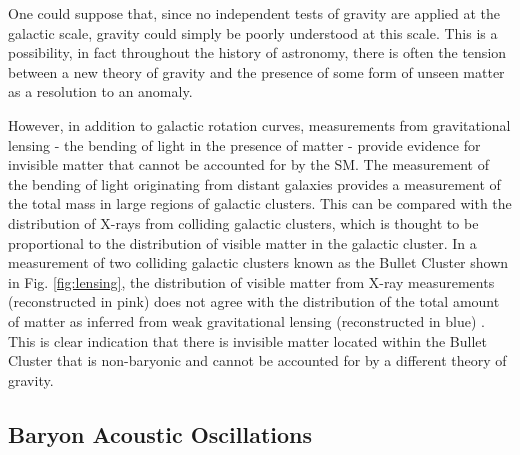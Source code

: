 One could suppose that, since no independent tests of gravity are applied at the galactic scale, gravity could simply be poorly understood at this scale. This is a possibility, in fact throughout the history of astronomy, there is often the tension between a new theory of gravity and the presence of some form of unseen matter as a resolution to an anomaly. %

However, in addition to galactic rotation curves, measurements from gravitational lensing - the bending of light in the presence of matter - provide evidence for invisible matter that cannot be accounted for by the SM. The measurement of the bending of light originating from distant galaxies provides a measurement of the total mass in large regions of galactic clusters. This can be compared with the distribution of X-rays from colliding galactic clusters, which is thought to be proportional to the distribution of visible matter in the galactic cluster. In a measurement of two colliding galactic clusters known as the Bullet Cluster shown in Fig. \ref{fig:lensing}, the distribution of visible matter from X-ray measurements (reconstructed in pink) does not agree with the distribution of the total amount of matter as inferred from weak gravitational lensing (reconstructed in blue) \cite{Clowe_2004}. This is clear indication that there is invisible matter located within the Bullet Cluster that is non-baryonic and cannot be accounted for by a different theory of gravity.

\clearpage

\subsection{Baryon Acoustic Oscillations}\label{sec:cmb}

